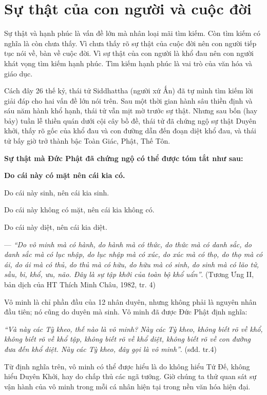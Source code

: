 \chapter{Sự thật của con người và cuộc đời} %
\label{cha:su_that_cua_con_nguoi_va_cuoc_doi}

Sự thật và hạnh phúc là vấn đề lớn mà nhân loại mãi tìm kiếm. Còn tìm kiếm có nghĩa là còn chưa thấy. Vì chưa thấy rõ sự thật của cuộc đời nên con người tiếp tục nói về, bàn về cuộc đời. Vì sự thật của con người là khổ đau nên con người khát vọng tìm kiếm hạnh phúc. Tìm kiếm hạnh phúc là vai trò của văn hóa và giáo dục.

Cách đây 26 thế kỷ, thái tử Siddhattha (người xứ Ấn) đã tự mình tìm kiếm lời giải đáp cho hai vấn đề lớn nói trên. Sau một thời gian hành sâu thiền định và sáu năm hành khổ hạnh, thái tử vẫn mịt mờ trước sự thật. Nhưng sau bốn (hay bảy) tuần lễ thiền quán dưới cội cây bồ đề, thái tử đã chứng ngộ sự thật Duyên khởi, thấy rõ gốc của khổ đau và con đường dẫn đến đoạn diệt khổ đau, và thái tử bấy giờ trở thành bậc Toàn Giác, Phật, Thế Tôn.

\hrulefill

{\bf Sự thật mà Đức Phật đã chứng ngộ có thể được tóm tắt như sau:}


{\bf Do cái này có mặt nên cái kia có.

Do cái này sinh, nên cái kia sinh.

Do cái này không có mặt, nên cái kia không có.

Do cái này diệt, nên cái kia diệt.}

— \emph{``Do vô minh mà có hành, do hành mà có thức, do thức mà có danh sắc, do danh sắc mà có lục nhập, do lục nhập mà có xúc, do xúc mà có thọ, do thọ mà có ái, do ái mà có thủ, do thủ mà có hữu, do hữu mà có sinh, do sinh mà có lão tử, sầu, bi, khổ, ưu, não. Đây là sự tập khởi của toàn bộ khổ uẩn''}. (Tương Ưng II, bản dịch của HT Thích Minh Châu, 1982, tr. 4)

\hrulefill

Vô minh là chỉ phần đầu của 12 nhân duyên, nhưng không phải là nguyên nhân đầu tiên; nó cũng do duyên mà sinh. Vô minh đã được Đức Phật định nghĩa:

\emph{``Và này các Tỳ kheo, thế nào là vô minh? Này các Tỳ kheo, không biết rõ về khổ, không biết rõ về khổ tập, không biết rõ về khổ diệt, không biết rõ về con đường đưa đến khổ diệt. Này các Tỳ kheo, đây gọi là vô minh''}. (sđd. tr.4)

Từ định nghĩa trên, vô minh có thể được hiểu là do không hiểu Tứ Đế, không hiểu Duyên Khởi, hay do chấp thủ các ngã tướng. Giờ chúng ta thử quan sát sự vận hành của vô minh trong mỗi cá nhân hiện tại trong nền văn hóa hiện đại.

